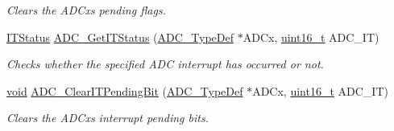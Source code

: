 \begin{DoxyCompactItemize}
\begin{DoxyCompactList}\small\item\em Clears the A\+D\+Cx\textquotesingle{}s pending flags. \end{DoxyCompactList}\item 
\hyperlink{agilefox_2library_2inc_2stm32f10x__type_8h_aacbd7ed539db0aacd973a0f6eca34074}{I\+T\+Status} \hyperlink{group___a_d_c___private___functions_gaa1d3b910a83dbf14d4f68c8eef058612}{A\+D\+C\+\_\+\+Get\+I\+T\+Status} (\hyperlink{struct_a_d_c___type_def}{A\+D\+C\+\_\+\+Type\+Def} $\ast$A\+D\+Cx, \hyperlink{_p_e___types_8h_a1f1825b69244eb3ad2c7165ddc99c956}{uint16\+\_\+t} A\+D\+C\+\_\+\+IT)
\begin{DoxyCompactList}\small\item\em Checks whether the specified A\+DC interrupt has occurred or not. \end{DoxyCompactList}\item 
\hyperlink{usb__devapi_8h_afabf60e7f57651d6d595a02c75f07cd0}{void} \hyperlink{group___a_d_c___private___functions_ga601c6a67bd883eb631ecc7aa5e999b9c}{A\+D\+C\+\_\+\+Clear\+I\+T\+Pending\+Bit} (\hyperlink{struct_a_d_c___type_def}{A\+D\+C\+\_\+\+Type\+Def} $\ast$A\+D\+Cx, \hyperlink{_p_e___types_8h_a1f1825b69244eb3ad2c7165ddc99c956}{uint16\+\_\+t} A\+D\+C\+\_\+\+IT)
\begin{DoxyCompactList}\small\item\em Clears the A\+D\+Cx\textquotesingle{}s interrupt pending bits. \end{DoxyCompactList}\end{DoxyCompactItemize}

